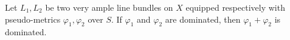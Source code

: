 \documentclass [11pt,reqno]{amsart}
\newcommand{\1}{\mathmybb{1}}
\def\cO{{\mathcal{O}}}
\begin{document}
\begin{proposition}
\label{prop:tensor_product_dominated_pseudo-metric_families_very_ample}
Let $L_1,L_2$ be two very ample line bundles on $X$ equipped respectively with pseudo-metrics $\varphi_1,\varphi_2$ over $S$. If $\varphi_1$ and $\varphi_2$ are dominated, then $\varphi_1+\varphi_2$ is dominated. 
\end{proposition}

\end{document}
